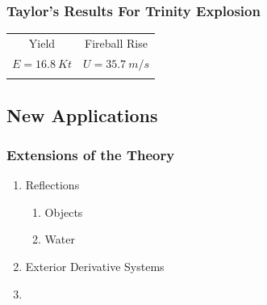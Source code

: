\begin{frame}\frametitle{Taylor's Results For Trinity Explosion}
\begin{table}[htp]
\begin{center}
	\begin{tabular}{cc}
		Yield & Fireball Rise\\[10pt]
		$E=16.8\ Kt$ & $U=35.7\ m/s$ \\[15pt]
		\pause
	\href{https://homepage.physics.uiowa.edu/~ghowes/teach/phys7729/docs/Taylor50b.pdf\#page=6}{
	\begin{overpic}[ scale = 0.3 ]
		{\pLocalGraphics taylor/p-table-3}
	\end{overpic}}  
		&
	\raisebox{0.35cm}{\href{https://homepage.physics.uiowa.edu/~ghowes/teach/phys7729/docs/Taylor50b.pdf\#page=15}{
	\begin{overpic}[ scale = 0.35 ]
		{\pLocalGraphics taylor/p-eq-32}
	\end{overpic}}}
	\end{tabular}
\end{center}
\end{table}
\end{frame}


		

\subsection{New Applications}
\begin{frame}\frametitle{Extensions of the Theory}
\begin{enumerate}
	\item Reflections
		\begin{enumerate}
			\item Objects
			\item Water
		\end{enumerate}
	\item Exterior Derivative Systems
	\item \bpe
\end{enumerate}
\end{frame}

